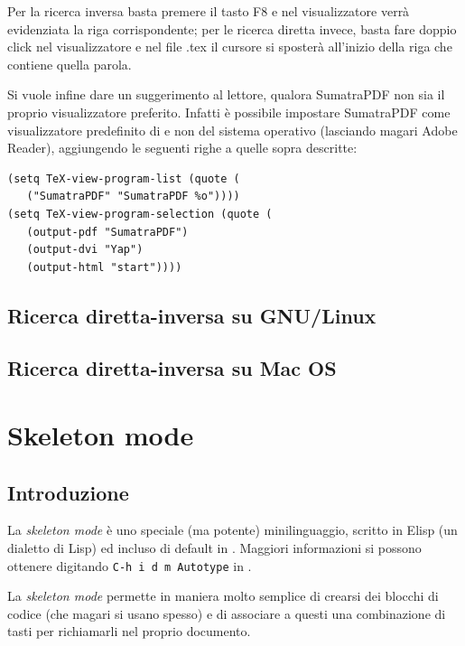 \documentclass[10pt,a4paper]{article}
\begin{document}
Per la ricerca inversa basta premere il tasto \textsf{F8} e nel
visualizzatore verrà evidenziata la riga corrispondente; per le
ricerca diretta invece, basta fare doppio click nel visualizzatore e
nel file .tex il cursore si sposterà all'inizio della riga che
contiene quella parola.

Si vuole infine dare un suggerimento al lettore, qualora \textsf{SumatraPDF}
non sia il proprio visualizzatore preferito. Infatti è possibile
impostare \textsf{SumatraPDF} come visualizzatore predefinito di \emacs{} e non
del sistema operativo (lasciando magari \textsf{Adobe Reader}), aggiungendo le
seguenti righe a quelle sopra descritte:
\begin{Verbatim}
(setq TeX-view-program-list (quote (
   ("SumatraPDF" "SumatraPDF %o"))))
(setq TeX-view-program-selection (quote (
   (output-pdf "SumatraPDF") 
   (output-dvi "Yap") 
   (output-html "start"))))
\end{Verbatim}

\subsection*{Ricerca diretta-inversa su GNU/Linux}
\label{sec:fislinux}

\textcolor{red}{\lipsum[1]}

\subsection*{Ricerca diretta-inversa su Mac OS}
\label{sec:fismac}

\textcolor{red}{\lipsum[1]}

\section{Skeleton mode}
\label{sec:skelmode}

\subsection*{Introduzione}
\label{skelintro}

La \emph{skeleton mode} è uno speciale (ma potente) minilinguaggio,
scritto in Elisp (un dialetto di Lisp) ed incluso di default in
\emacs. Maggiori informazioni si possono ottenere digitando 
\verb!C-h i d m Autotype! in \emacs.

La \emph{skeleton mode} permette in maniera molto semplice di crearsi
dei blocchi di codice (che magari si usano spesso) e di associare a
questi una combinazione di tasti per richiamarli nel proprio
documento.
\end{document}
